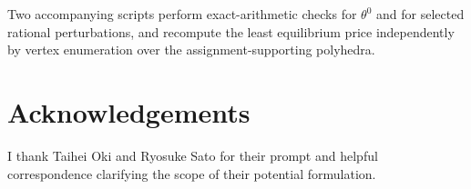 \documentclass[11pt,a4paper,fleqn]{article}
\theoremstyle{plain}
\theoremstyle{definition}
\begin{document}
Two accompanying scripts perform exact-arithmetic checks for $\theta^0$ and for selected rational perturbations, and recompute the least equilibrium price independently by vertex enumeration over the assignment-supporting polyhedra.

\section*{Acknowledgements}

I thank Taihei Oki and Ryosuke Sato for their prompt and helpful correspondence clarifying the scope of their potential formulation.



\end{document}
